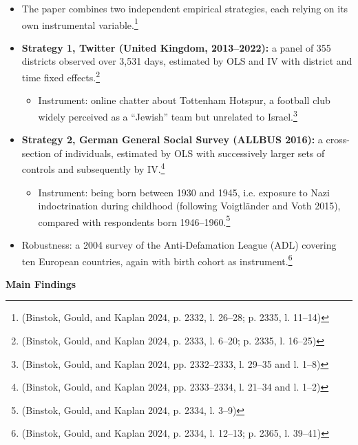 \begin{itemize}
\item
  The paper combines two independent empirical strategies, each relying on its own instrumental variable.\footnote{(Binstok, Gould, and Kaplan 2024, p. 2332, l. 26--28; p. 2335, l. 11--14)}
\item
  \textbf{Strategy 1, Twitter (United Kingdom, 2013--2022):} a panel of 355 districts observed over 3,531 days, estimated by OLS and IV with district and time fixed effects.\footnote{(Binstok, Gould, and Kaplan 2024, p. 2333, l. 6--20; p. 2335, l. 16--25)}

  \begin{itemize}
  \item
    Instrument: online chatter about Tottenham Hotspur, a football club widely perceived as a ``Jewish'' team but unrelated to Israel.\footnote{(Binstok, Gould, and Kaplan 2024, pp. 2332--2333, l. 29--35 and l. 1--8)}
  \end{itemize}
\item
  \textbf{Strategy 2, German General Social Survey (ALLBUS 2016):} a cross-section of individuals, estimated by OLS with successively larger sets of controls and subsequently by IV.\footnote{(Binstok, Gould, and Kaplan 2024, pp. 2333--2334, l. 21--34 and l. 1--2)}

  \begin{itemize}
  \item
    Instrument: being born between 1930 and 1945, i.e. exposure to Nazi indoctrination during childhood (following Voigtländer and Voth 2015), compared with respondents born 1946--1960.\footnote{(Binstok, Gould, and Kaplan 2024, p. 2334, l. 3--9)}
  \end{itemize}
\item
  Robustness: a 2004 survey of the Anti-Defamation League (ADL) covering ten European countries, again with birth cohort as instrument.\footnote{(Binstok, Gould, and Kaplan 2024, p. 2334, l. 12--13; p. 2365, l. 39--41)}
\end{itemize}

\par\textbf{Main Findings}\par

